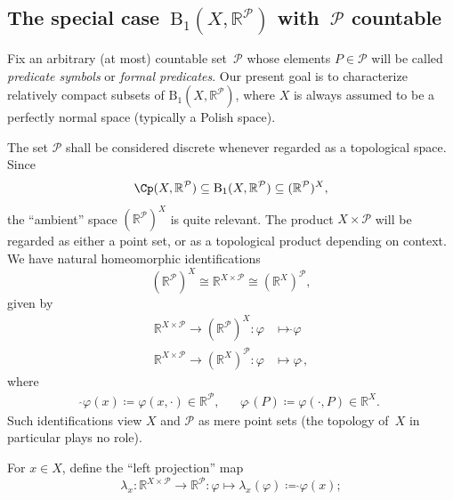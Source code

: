 \subsection{The special case~\texorpdfstring{$\mathrm{B}_1(X,\mathbb{R}^\mathcal{P})$}{B\_1(X, R\textasciicircum P)} with~\texorpdfstring{$\mathcal{P}$}{P} countable}

Fix an arbitrary (at most) countable set~$\mathcal{P}$ whose elements $P\in \mathcal{P}$ will be called \emph{predicate symbols} or \emph{formal predicates}.
Our present goal is to characterize relatively compact subsets of $\mathrm{B}_1(X,\mathbb{R}^\mathcal{P})$, where $X$ is always assumed to be a perfectly normal space (typically a Polish space).

The set $\mathcal{P}$ shall be considered discrete whenever regarded as a topological space.
Since $$\Cp(X, \mathbb{R}^{\mathcal{P}})\subseteq \mathrm{B}_1(X, \mathbb{R}^{\mathcal{P}})\subseteq (\mathbb{R}^{\mathcal{P}})^X,$$ the ``ambient'' space $(\mathbb{R}^{\mathcal{P}})^X$ is quite relevant.
The product $X\times \mathcal{P}$ will be regarded as either a point set, or as a topological product depending on context.
We have natural homeomorphic identifications
\begin{equation*}
    (\mathbb{R}^{\mathcal{P}})^X \cong \mathbb{R}^{X\times \mathcal{P}} \cong (\mathbb{R}^X)^{\mathcal{P}},
\end{equation*}
given by
\begin{align*}
    \mathbb{R}^{X\times \mathcal{P}} \to (\mathbb{R}^{\mathcal{P}})^X: \varphi &\mapsto {\hat{}}\varphi \\
    \mathbb{R}^{X\times \mathcal{P}} \to (\mathbb{R}^X)^{\mathcal{P}}: \varphi &\mapsto \varphi{\,\hat{}},
\end{align*}
where 
\begin{align*}
    \hat{}\varphi(x)\coloneqq \varphi(x, \cdot)\in \mathbb{R}^{\mathcal{P}}, &&
    \varphi\,\hat{}(P)\coloneqq \varphi(\cdot, P) \in \mathbb{R}^X.
\end{align*}
Such identifications view $X$ and $\mathcal{P}$ as mere point sets (the topology of~$X$ in particular plays no role).

For $x\in X$, define the ``left projection'' map
\begin{equation*}
    \lambda_x\colon \mathbb{R}^{X\times\mathcal{P}}\to \mathbb{R}^{\mathcal{P}}: \varphi\mapsto \lambda_x(\varphi)\coloneqq \hat{}\varphi(x);
\end{equation*}

